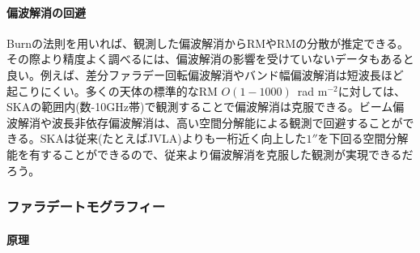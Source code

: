 \paragraph{偏波解消の回避}

Burnの法則を用いれば、観測した偏波解消からRMやRMの分散が推定できる。その際より精度よく調べるには、偏波解消の影響を受けていないデータもあると良い。例えば、差分ファラデー回転偏波解消やバンド幅偏波解消は短波長ほど起こりにくい。多くの天体の標準的なRM $O(1-1000)$~rad m$^{-2}$に対しては、SKAの範囲内(数-10GHz帯)で観測することで偏波解消は克服できる。ビーム偏波解消や波長非依存偏波解消は、高い空間分解能による観測で回避することができる。SKAは従来(たとえばJVLA)よりも一桁近く向上した$1''$を下回る空間分解能を有することができるので、従来より偏波解消を克服した観測が実現できるだろう。

\subsubsection{ファラデートモグラフィー}
\label{c06.s1.ss1.sss4}

\paragraph{原理}

